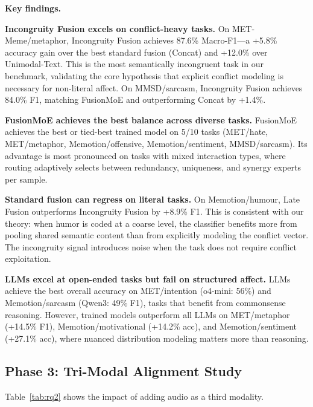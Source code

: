 \textbf{Key findings.}

\textbf{Incongruity Fusion excels on conflict-heavy tasks.}
On MET-Meme/metaphor, Incongruity Fusion achieves 87.6\% Macro-F1—a +5.8\% accuracy gain over
the best standard fusion (Concat) and +12.0\% over Unimodal-Text. This is the most semantically
incongruent task in our benchmark, validating the core hypothesis that explicit conflict modeling
is necessary for non-literal affect. On MMSD/sarcasm, Incongruity Fusion achieves 84.0\% F1,
matching FusionMoE and outperforming Concat by +1.4\%.

\textbf{FusionMoE achieves the best balance across diverse tasks.}
FusionMoE achieves the best or tied-best trained model on 5/10 tasks (MET/hate, MET/metaphor,
Memotion/offensive, Memotion/sentiment, MMSD/sarcasm). Its advantage is most pronounced on tasks
with mixed interaction types, where routing adaptively selects between redundancy, uniqueness, and
synergy experts per sample.

\textbf{Standard fusion can regress on literal tasks.}
On Memotion/humour, Late Fusion outperforms Incongruity Fusion by +8.9\% F1. This is consistent
with our theory: when humor is coded at a coarse level, the classifier benefits more from pooling
shared semantic content than from explicitly modeling the conflict vector. The incongruity signal
introduces noise when the task does not require conflict exploitation.

\textbf{LLMs excel at open-ended tasks but fail on structured affect.}
LLMs achieve the best overall accuracy on MET/intention (o4-mini: 56\%) and Memotion/sarcasm
(Qwen3: 49\% F1), tasks that benefit from commonsense reasoning. However, trained models
outperform all LLMs on MET/metaphor (+14.5\% F1), Memotion/motivational (+14.2\% acc), and
Memotion/sentiment (+27.1\% acc), where nuanced distribution modeling matters more than reasoning.

\subsection{Phase 3: Tri-Modal Alignment Study}

Table~\ref{tab:rq2} shows the impact of adding audio as a third modality.

